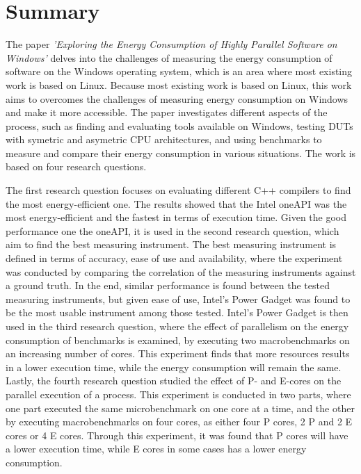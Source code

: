 \section*{Summary}

The paper \textit{'Exploring the Energy Consumption of Highly Parallel Software on Windows'} delves into the challenges of measuring the energy consumption of software on the Windows operating system, which is an area where most existing work is based on Linux. Because most existing work is based on Linux, this work aims to overcomes the challenges of measuring energy consumption on Windows and make it more accessible. The paper investigates different aspects of the process, such as finding and evaluating tools available on Windows, testing DUTs with symetric and asymetric CPU architectures, and using benchmarks to measure and compare their energy consumption in various situations. The work is based on four research questions.

The first research question focuses on evaluating different C++ compilers to find the most energy-efficient one. The results showed that the Intel oneAPI was the most energy-efficient and the fastest in terms of execution time. Given the good performance one the oneAPI, it is used in the second research question, which aim to find the best measuring instrument. The best measuring instrument is defined in terms of accuracy, ease of use and availability, where the experiment was conducted by comparing the correlation of the measuring instruments against a ground truth. In the end, similar performance is found between the tested measuring instruments, but given ease of use, Intel's Power Gadget was found to be the most usable instrument among those tested. Intel's Power Gadget is then used in the third research question, where the effect of parallelism on the energy consumption of benchmarks is examined, by executing two macrobenchmarks on an increasing number of cores. This experiment finds that more resources results in a lower execution time, while the energy consumption will remain the same. Lastly, the fourth research question studied the effect of P- and E-cores on the parallel execution of a process. This experiment is conducted in two parts, where one part executed the same microbenchmark on one core at a time, and the other by executing macrobenchmarks on four cores, as either four P cores, 2 P and 2 E cores or 4 E cores. Through this experiment, it was found that P cores will have a lower execution time, while E cores in some cases has a lower energy consumption.

